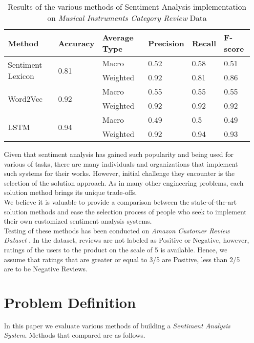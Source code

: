 \documentclass[11pt,a4paper]{article}
\begin{document}
\begin{table*}[ht]
	\centering
	\begin{tabular}{|l|l|l|l|l|l|}
		\hline
		\textbf{Method} & \textbf{Accuracy} & \textbf{Average Type} & \textbf{Precision} & \textbf{Recall} & \textbf{F-score} \\ \hline
		\multirow{2}{*}{Sentiment Lexicon} & \multirow{2}{*}{0.81} & Macro & 0.52 & 0.58 & 0.51 \\ \cline{3-6}
		& & Weighted & 0.92 & 0.81 & 0.86 \\ \hline
		\multirow{2}{*}{Word2Vec} & \multirow{2}{*}{0.92} & Macro & 0.55 & 0.55 & 0.55\\ \cline{3-6}
		& & Weighted & 0.92 & 0.92 & 0.92 \\ \hline
		\multirow{2}{*}{LSTM} & \multirow{2}{*}{0.94} & Macro & 0.49 & 0.5 & 0.49 \\ \cline{3-6}
		& & Weighted & 0.92 & 0.94 & 0.93 \\ \hline  
	\end{tabular}
	\caption{Results of the various methods of Sentiment Analysis implementation on \textit{Musical Instruments Category Review} Data}
\end{table*}

Given that sentiment analysis has gained such popularity and being used for various of tasks, there are many individuals and organizations that implement such systems for their works. However, initial challenge they encounter is the selection of the solution approach. As in many other engineering problems, each solution method brings its unique trade-offs. \\

We believe it is valuable to provide a comparison between the state-of-the-art solution methods and ease the selection process of people who seek to implement their own customized sentiment analysis systems. \\

 Testing of these methods has been conducted on \textit{Amazon Customer Review Dataset} \cite{He_2016, mcauley2015imagebased}. In the dataset, reviews are not labeled as Positive or Negative, however, ratings of the users to the product on the scale of 5 is available. Hence, we assume that ratings that are greater or equal to 3/5 are Positive, less than 2/5 are to be Negative Reviews.
 
\section{Problem Definition}
In this paper we evaluate various methods of building a \textit{Sentiment Analysis System}. Methods that compared are as follows.
\end{document}
